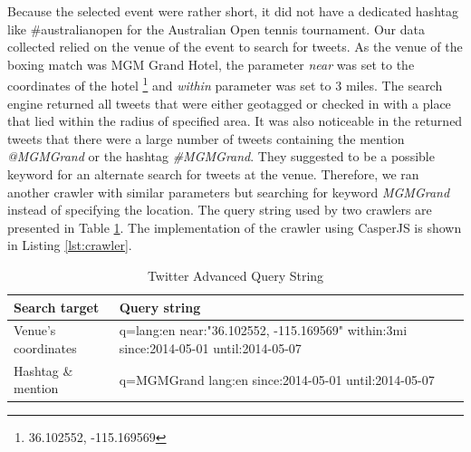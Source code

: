 Because the selected event were rather short, it did not have a dedicated hashtag like \#australianopen for the Australian Open tennis tournament. Our data collected relied on the venue of the event to search for tweets. As the venue of the boxing match was MGM Grand Hotel, the parameter \textit{near} was set to the coordinates of the hotel \footnote{36.102552, -115.169569} and \textit{within} parameter was set to 3 miles. The search engine returned all tweets that were either geotagged or checked in with a place that lied within the radius of specified area. It was also noticeable in the returned tweets that there were a large number of tweets containing the mention \textit{@MGMGrand} or the hashtag \textit{\#MGMGrand}. They suggested to be a possible keyword for an alternate search for tweets at the venue. Therefore, we ran another crawler with similar parameters but searching for keyword \textit{MGMGrand} instead of specifying the location. The query string used by two crawlers are presented in Table \ref{table:crawlerURL}. The implementation of the crawler using CasperJS is shown in Listing \ref{lst:crawler}. 

\begin{table}[!h]
\caption{Twitter Advanced Query String}
\label{table:crawlerURL}
\centering
\begin{tabular}{|p{3.5cm}|p{11cm}|}

\hline
\textbf{Search target} & \textbf{Query string} \\ \hline \hline
Venue's coordinates & q=lang:en near:"36.102552, -115.169569" within:3mi since:2014-05-01 until:2014-05-07 \\ \hline
Hashtag \& mention & q=MGMGrand lang:en since:2014-05-01 until:2014-05-07 \\ \hline

\end{tabular}
\end{table}

